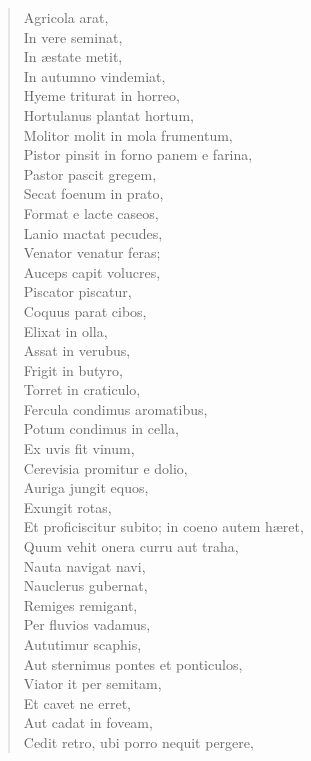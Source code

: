 \begin{verse}

  Agricola arat,\\
  In vere seminat,\\
  In æstate metit,\\
  In autumno vindemiat,\\
  Hyeme triturat in horreo,\\
  Hortulanus plantat hortum,\\
  Molitor molit in mola frumentum,\\
  Pistor pinsit in forno panem e farina,\\
  Pastor pascit gregem,\\
  Secat foenum in prato,\\
  Format e lacte caseos,\\
  Lanio mactat pecudes,\\
  Venator venatur feras;\\
  Auceps capit volucres,\\
  Piscator piscatur,\\
  Coquus parat cibos,\\
  Elixat in olla,\\
  Assat in verubus,\\
  Frigit in butyro,\\
  Torret in craticulo,\\
  Fercula condimus aromatibus,\\
  Potum condimus in cella,\\
  Ex uvis fit vinum,\\
  Cerevisia promitur e dolio,\\
  Auriga jungit equos,\\
  Exungit rotas,\\
  Et proficiscitur subito; in coeno autem hæret,\\
  Quum vehit onera curru aut traha,\\
  Nauta navigat navi,\\
  Nauclerus gubernat,\\
  Remiges remigant,\\
  Per fluvios vadamus,\\
  Aututimur scaphis,\\
  Aut sternimus pontes et ponticulos,\\
  Viator it per semitam,\\
  Et cavet ne erret,\\
  Aut cadat in foveam,\\
  Cedit retro, ubi porro nequit pergere,\\

\end{verse}
